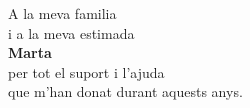 \thispagestyle{empty}

\vfill

\begin{center}
    \sffamily
    A la meva familia \\
    i a la meva estimada \\
    \textbf{Marta} \\
    per tot el suport i l'ajuda \\
    que m'han donat durant aquests anys.
\end{center}

\vfill